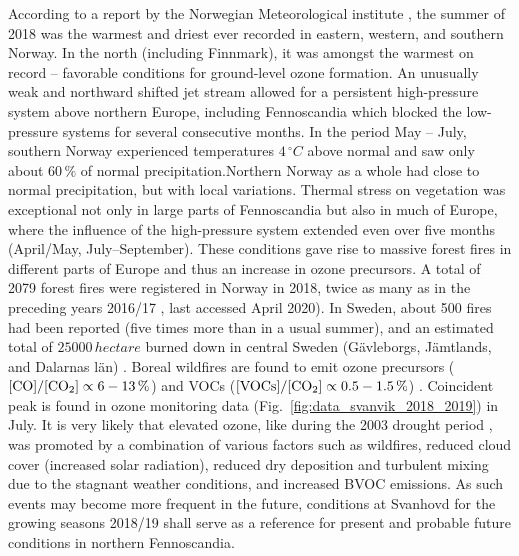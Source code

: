 \documentclass[bg, manuscript]{copernicus}
\begin{document}
According to a report by the Norwegian Meteorological institute \citep{MetNOR2019}, the summer of 2018 was the warmest and driest ever recorded in eastern, western, and southern Norway. In the north (including Finnmark), it was amongst the warmest on record -- favorable conditions for ground-level ozone formation.
An unusually weak and northward shifted jet stream allowed for a persistent high-pressure system above northern Europe, including Fennoscandia which blocked the low-pressure systems for several consecutive months. In the period May -- July, southern Norway experienced temperatures $4\,\unit{^\circ C}$ above normal and saw only about $60\,\unit{\%}$ of normal precipitation.Northern Norway as a whole had close to normal precipitation, but with local variations.
Thermal stress on vegetation was exceptional not only in large parts of Fennoscandia but also in much of Europe, where the influence of the high-pressure system extended even over five months (April/May, July--September). These conditions gave rise to massive forest fires in different parts of Europe and thus an increase in ozone precursors.
A total of 2079 forest fires were registered in Norway in 2018, twice as many as in the preceding years 2016/17 \citep{DSB2019}, last accessed April 2020). In Sweden, about 500 fires had been reported (five times more than in a usual summer), and an estimated total of $25000\,\unit{hectare}$ burned down in central Sweden (G\"{a}vleborgs, J\"{a}mtlands, and Dalarnas l\"{a}n) \citep{SOU2019}. Boreal wildfires are found to emit ozone precursors  ($\chem{[CO]}/\chem{[CO_2]} \propto 6-13\,\unit{\%}$) and VOCs ($\chem{[VOCs]}/\chem{[CO_2]} \propto 0.5-1.5\,\unit{\%}$) \citep{AE:Cofer1990}. Coincident peak \chem{[O_3]} is found in ozone monitoring data (Fig.~\ref{fig:data_svanvik_2018_2019}) in July. It is very likely that elevated ozone, like during the 2003 drought period \citep{JGR:Solberg2018}, was promoted by a combination of various factors such as wildfires, reduced cloud cover (increased solar radiation), reduced dry deposition and turbulent mixing due to the stagnant weather conditions, and increased BVOC emissions. As such events may become more frequent in the future, conditions at Svanhovd for the growing seasons 2018/19 shall serve as a reference for present and probable future conditions in northern Fennoscandia.\\
\end{document}
